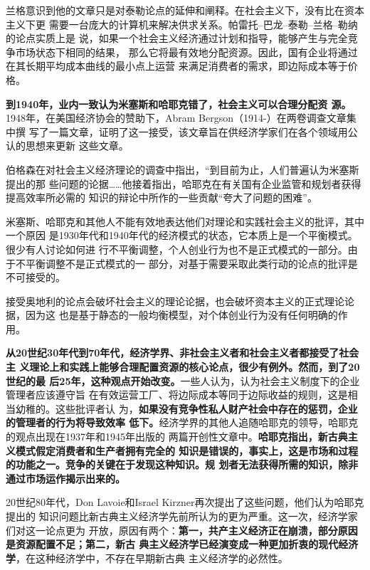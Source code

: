 兰格意识到他的文章只是对泰勒论点的延伸和阐释。在社会主义下，没有比在资本主义下更
需要一台庞大的计算机来解决供求关系。帕雷托--巴龙--泰勒--兰格--勒纳的论点实质上是
说，如果一个社会主义经济通过计划和指导，能够产生与完全竞争市场状态下相同的结果，
那么它将最有效地分配资源。因此，国有企业将通过在其长期平均成本曲线的最小点上运营
来满足消费者的需求，即边际成本等于价格。

\textbf{到1940年，业内一致认为米塞斯和哈耶克错了，社会主义可以合理分配资
  源。}1948年，在美国经济协会的赞助下，Abram Bergson（1914-）在两卷调查文章集中撰
写了一篇文章，证明了这一接受，该文章旨在供经济学家们在各个领域用公认的思想来更新
这些文章。

伯格森在对社会主义经济理论的调查中指出，“到目前为止，人们普遍认为米塞斯提出的那
些问题的论据……他接着指出，哈耶克在有关国有企业监管和规划者获得提高效率所必需的
知识的辩论中所作的一些贡献“夸大了问题的困难”。

米塞斯、哈耶克和其他人不能有效地表达他们对理论和实践社会主义的批评，其中一个原因
是1930年代和1940年代的经济模式的状态，它本质上是一个平衡模式。很少有人讨论如何进
行不平衡调整，个人创业行为也不是正式模式的一部分。由于不平衡调整不是正式模式的一
部分，对基于需要采取此类行动的论点的批评是不可接受的。

接受奥地利的论点会破坏社会主义的理论论据，也会破坏资本主义的正式理论论据，因为这
也是基于静态的一般均衡模型，对个体创业行为没有任何明确的作用。

\textbf{从20世纪30年代到70年代，经济学界、非社会主义者和社会主义者都接受了社会主
  义理论上和实践上能够合理配置资源的核心论点，很少有例外。然而，到了20世纪的最
  后25年，这种观点开始改变。}一些人认为，认为社会主义制度下的企业管理者应该遵守旨
在有效运营工厂、将边际成本等同于边际收益的规则，这是相当幼稚的。这些批评者认
为，\textbf{如果没有竞争性私人财产社会中存在的惩罚，企业的管理者的行为将导致效率
  低下。}经济学界的其他人追随哈耶克的领导，哈耶克的观点出现在1937年和1945年出版的
两篇开创性文章中。\textbf{哈耶克指出，新古典主义模式假定消费者和生产者拥有完全的
  知识是错误的，事实上，这是市场和过程的功能之一。竞争的关键在于发现这种知识。规
  划者无法获得所需的知识，除非通过市场运作揭示出来的。}

20世纪80年代，Don Lavoie和Israel Kirzner再次提出了这些问题，他们认为哈耶克提出的
知识问题比新古典主义经济学先前所认为的更为严重。这一次，经济学家们对这一论点更为
开放，原因有两个：\textbf{第一，共产主义经济正在崩溃，部分原因是资源配置不足；第二，新古
典主义经济学已经演变成一种更加折衷的现代经济学}，在这种经济学中，不存在早期新古典
主义经济学的必然性。

